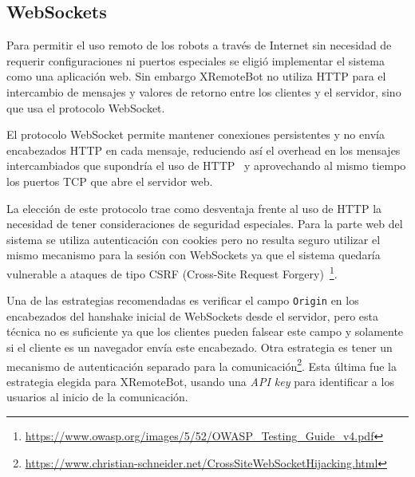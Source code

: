 % 
% 

\subsection{WebSockets}\label{sec:websockets}

Para permitir el uso remoto de los robots a través de Internet sin necesidad
de requerir configuraciones ni puertos especiales se eligió implementar el
sistema como una
aplicación web. Sin embargo XRemoteBot
no utiliza HTTP para el intercambio de
mensajes y valores de retorno entre los clientes y el servidor, sino
que usa el
protocolo WebSocket.

El protocolo WebSocket permite mantener conexiones persistentes y no envía
encabezados HTTP en cada mensaje, reduciendo así el overhead en los mensajes
intercambiados que supondría el uso de HTTP~\citep{wang_2013} y aprovechando al
mismo tiempo los puertos TCP que abre el servidor web.

La elección de este protocolo trae como desventaja frente al uso de HTTP la
necesidad de tener consideraciones de seguridad especiales. Para la parte
web del sistema se utiliza autenticación con cookies pero no resulta seguro
utilizar el mismo mecanismo para la sesión con WebSockets ya que el sistema
quedaría vulnerable a ataques de tipo CSRF (Cross-Site Request
Forgery)~\citep{owasp_2014}\footnote{
\url{https://www.owasp.org/images/5/52/OWASP_Testing_Guide_v4.pdf}}.

Una de las estrategias recomendadas es verificar el campo \texttt{Origin}
en los encabezados del hanshake inicial de WebSockets
desde el servidor, pero esta técnica no es suficiente ya que los
clientes pueden falsear este campo y solamente si el cliente es un navegador
envía este encabezado.
Otra estrategia es tener un mecanismo de autenticación
separado para la comunicación\footnote{\url{https://www.christian-schneider.net/CrossSiteWebSocketHijacking.html}}.
Esta última fue la estrategia elegida para XRemoteBot, usando una \textit{API key}
para identificar a los usuarios al inicio de la comunicación.


